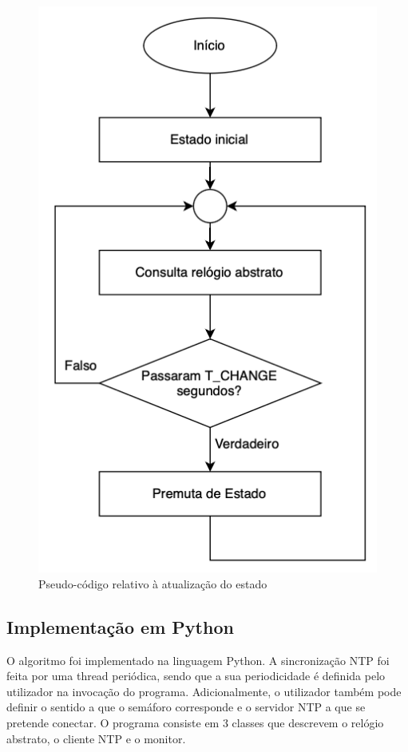     \begin{figure}[h]
        \centering
        \includegraphics[width=0.55\linewidth]{figures/pseudoCodigoEstado.png}
        \caption{Pseudo-código relativo à atualização do estado}
        \label{fig:pseudoCodigoEstado}
    \end{figure}


\subsection{Implementação em Python}

    O algoritmo foi implementado na linguagem Python. A sincronização NTP foi feita por uma thread periódica, sendo que a sua periodicidade é definida pelo utilizador na invocação do programa. Adicionalmente, 
    o utilizador também pode definir o sentido a que o semáforo
    corresponde e o servidor NTP a que se pretende conectar. O programa consiste em 3 classes que descrevem o relógio abstrato, o cliente NTP e o monitor.
    